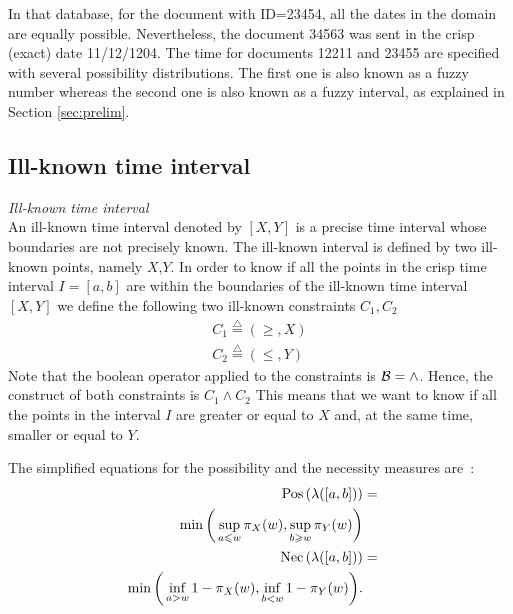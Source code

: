 In that database, for the document with ID=23454, all the dates in the domain are equally possible. Nevertheless, the document 34563 was sent in the crisp (exact) date 11/12/1204. The time for documents 12211 and 23455 are specified with several possibility distributions. The first one is also known as a fuzzy number whereas the second one is also known as a fuzzy interval, as explained in Section \ref{sec:prelim}.
 
 
 


\subsection{\label{subsec:ill-known-interval}Ill-known time interval}


\begin{definition}
\emph{Ill-known time interval}\\
An ill-known time interval denoted by $\left[X, Y\right]$ is a precise time interval whose boundaries are not precisely known. The ill-known interval is defined by two ill-known points, namely $X$,$Y$.
In order to know if all the points in the crisp time interval $I=\left[a, b\right]$ are within the boundaries of the ill-known time interval $\left[X, Y\right]$ we define the following two ill-known constraints $C_{1}, C_{2}$ 
\begin{eqnarray}
C_1\stackrel{\triangle}{=}\left(\geq,X\right)  \\
C_2\stackrel{\triangle}{=}\left(\leq,Y\right)
\end{eqnarray}
Note that the boolean operator applied to the constraints is $\operatorname*{\mathcal{B}}=\wedge$. Hence, the construct of both constraints is $C_1 \wedge C_2$
This means that we want to know if all the points in the interval $I$ are greater or equal to $X$ and, at the same time, smaller or equal to $Y$.
\end{definition}

The simplified equations for the possibility and the necessity measures are~\cite{Pons2011}:
\begin{eqnarray}
\label{eq:interval-pos}
\operatorname{Pos}\left(\lambda([a,b])\right)&=&\\
\nonumber
\min\bigg(\sup_{a\leqslant w}\pi_{X}(w),\sup_{b\geqslant w}\pi_{Y}(w)\bigg)\\
\label{eq:interval-nec}
\operatorname{Nec}\left(\lambda([a,b])\right)&=&\\
\nonumber
\min\bigg(\inf_{a>w}1-\pi_{X}(w),\inf_{b<w}1-\pi_{Y}(w)\bigg).
\end{eqnarray}




